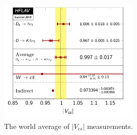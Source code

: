  \begin{figure}
    \centering
    \includegraphics[width=0.6\textwidth]{chapters/RelatedWorks/sectionVcs/figures/vcs.png}
    \caption{The world average of $|V_{cs}|$ measurements. }
    \label{fig:relatedWorks:vcs:measurements}
\end{figure}
